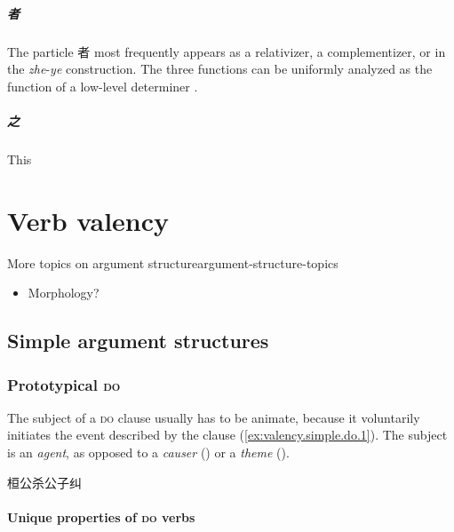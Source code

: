 \documentclass[UTF8, a4paper, oneside, scheme=plain, 12pt]{ctexrep}
\newcommand*{\term}[1]{\emph{#1}}
\newcommand{\form}[1]{\emph{#1}}
\newcommand*{\category}[1]{\textsc{#1}}
\begin{document}
\paragraph*{者} The particle 者 most frequently appears as a relativizer, a complementizer,
or in the \form{zhe}-\form{ye} construction.
The three functions can be uniformly analyzed as the function of a low-level determiner \citep{aldridge2009old}. 

\paragraph*{之} This 

\chapter{Verb valency}

\begin{todobox}{More topics on argument structure}{argument-structure-topics}
    \begin{itemize}
        \item Morphology?
    \end{itemize}
\end{todobox}

\section{Simple argument structures}
\label{sec:grammatical.clause.verbal.argument.simple}

\subsection{Prototypical \category{do}}
\label{sec:valency.simple.do}

The subject of a \category{do} clause usually has to be animate,
because it voluntarily initiates the event described by the clause
(\ref{ex:valency.simple.do.1}).
The subject is an \term{agent}, as opposed to a \term{causer} ()
or a \term{theme} ().

\begin{exe}
    \ex\label{ex:valency.simple.do.1} 桓公杀公子纠
\end{exe}

\subsubsection{Unique properties of \category{do} verbs}\label{sec:valency.simple.do.properties}
\end{document}
